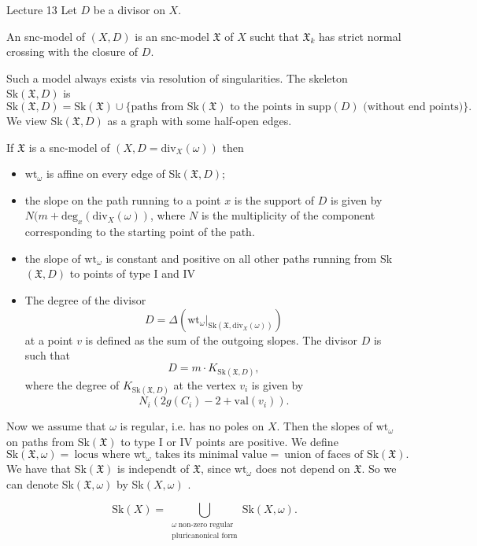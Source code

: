 \begin{section}{Lecture 13}
Let $D$ be a divisor on $X$. 
\begin{definition}
 An snc-model of $(X,D)$ is an snc-model $\mathfrak{X}$ of $X$ sucht that $\mathfrak{X}_k$ has strict normal crossing with the closure of $D$.
\end{definition}
Such a model always exists via resolution of singularities. The skeleton $\textrm{Sk}(\mathfrak{X},D)$ is 
\[
 \textrm{Sk}(\mathfrak{X},D) = \textrm{Sk}(\mathfrak{X}) \cup \{\textrm{paths from Sk$(\mathfrak{X})$ to the points in supp$(D)$ (without end points)}\}.
 \]
We view Sk$(\mathfrak{X}, D)$ as a graph with some half-open edges. 
\begin{theorem} If $\mathfrak{X}$ is a snc-model of $(X, D=\textrm{div}_X(\omega))$ then 
\begin{itemize}
 \item $\textrm{wt}_{\omega}$ is affine on every edge of Sk$(\mathfrak{X}, D)$;
 \item the slope on the path running to a point $x$ is the support of $D$ is given by $N(m + \textrm{deg}_x(\textrm{div}_X (\omega))$, where $N$ is the multiplicity of the component corresponding to the starting point of the path.
 \item the slope of $\textrm{wt}_{\omega}$ is constant and positive on all other paths running from Sk$(\mathfrak{X}, D)$ to points of type I and IV
 \item The degree of the divisor 
 \[
  D = \Delta(\textrm{wt}_{\omega}|_{\textrm{Sk}(\mathfrak{X}, \textrm{div}_X(\omega))})
 \]
at a point $v$ is defined as the sum of the outgoing slopes. The divisor $D$ is such that
\[
 D = m \cdot K_{\textrm{Sk}(\mathfrak{X},D)},
\]
where the degree of $K_{\textrm{Sk}(\mathfrak{X},D)}$ at the vertex $v_i$ is given by 
\[
 N_i(2g(C_i)-2+\textrm{val}(v_i)).
 \]
\end{itemize}
\end{theorem}
Now we assume that $\omega$ is regular, i.e. has no poles on $X$. Then the slopes of $\textrm{wt}_{\omega}$ on paths from Sk$(\mathfrak{X})$ to type I or IV points are positive. We define 
\[
 \textrm{Sk}(\mathfrak{X}, \omega) = \ \textrm{locus where $\textrm{wt}_{\omega}$ takes its minimal value} = \ \textrm{union of faces of Sk$(\mathfrak{X}).$}
\]
We have that Sk$(\mathfrak{X})$ is independt of $\mathfrak{X}$, since $\textrm{wt}_{\omega}$ does not depend on $\mathfrak{X}$. So we can denote Sk$(\mathfrak{X}, \omega)$ by Sk$(X, \omega)$ . 
\begin{definition}
 \[
  \textrm{Sk}(X) = \bigcup_{\substack{\omega \ \textrm{non-zero regular}  \\ \textrm{pluricanonical form}}} \textrm{Sk}(X, \omega).
\]
\end{definition}


\end{section}
